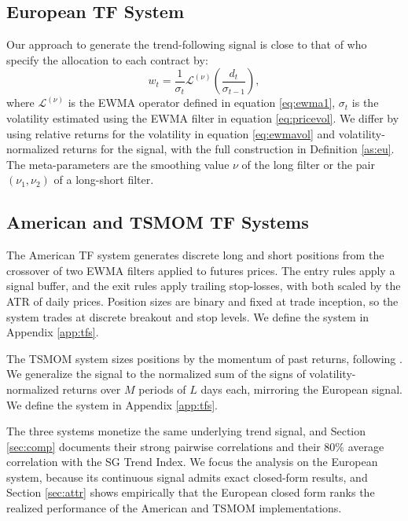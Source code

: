 \documentclass[hidelinks]{siamonline250211}
\begin{document}
\subsection{European TF System}

Our approach to generate the trend-following signal is close to that of \cite{Bouchaud2017} who specify the allocation to each contract by:
\begin{equation} \label{eq:etf1} 
	w_{t} = \frac{1}{\sigma_{t}}  \mathcal{L}^{(\nu)} \left(\frac{d_{t}}{\sigma_{t-1}}\right), 
\end{equation}
where $\mathcal{L}^{(\nu)}$ is the EWMA operator defined in equation \eqref{eq:ewma1}, $\sigma_{t}$ is the volatility estimated using the EWMA filter in equation \eqref{eq:pricevol}. We differ by using relative returns for the volatility in equation \eqref{eq:ewmavol} and volatility-normalized returns for the signal, with the full construction in Definition \ref{as:eu}. The meta-parameters are the smoothing value $\nu$ of the long filter or the pair $(\nu_{1}, \nu_{2})$ of a long-short filter.






\subsection{American and TSMOM TF Systems}

The American TF system generates discrete long and short positions from the crossover of two EWMA filters applied to futures prices. The entry rules apply a signal buffer, and the exit rules apply trailing stop-losses, with both scaled by the ATR of daily prices. Position sizes are binary and fixed at trade inception, so the system trades at discrete breakout and stop levels. We define the system in Appendix \ref{app:tfs}.

The TSMOM system sizes positions by the momentum of past returns, following \cite{Moskowitz2012}. We generalize the signal to the normalized sum of the signs of volatility-normalized returns over $M$ periods of $L$ days each, mirroring the European signal. We define the system in Appendix \ref{app:tfs}.

The three systems monetize the same underlying trend signal, and Section \ref{sec:comp} documents their strong pairwise correlations and their $80\%$ average correlation with the SG Trend Index. We focus the analysis on the European system, because its continuous signal admits exact closed-form results, and Section \ref{sec:attr} shows empirically that the European closed form ranks the realized performance of the American and TSMOM implementations.
\end{document}
